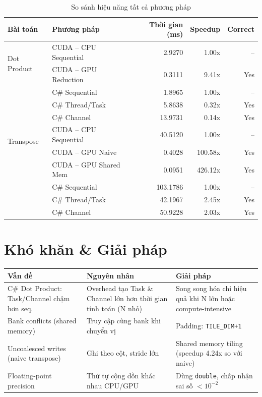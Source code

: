 \documentclass[12pt,a4paper]{article}
\begin{document}
\begin{table}[H]
\centering
\caption{So sánh hiệu năng tất cả phương pháp}
\begin{tabular}{llrrr}
\toprule
\textbf{Bài toán} & \textbf{Phương pháp} & \textbf{Thời gian (ms)} & \textbf{Speedup} & \textbf{Correct} \\
\midrule
\multirow{2}{*}{Dot Product} 
  & CUDA -- CPU Sequential  & 2.9270  & 1.00x & -- \\
  & CUDA -- GPU Reduction   & 0.3111  & 9.41x & Yes \\
  & C\# Sequential          & 1.8965  & 1.00x & -- \\
  & C\# Thread/Task         & 5.8638  & 0.32x & Yes \\
  & C\# Channel             & 13.9731 & 0.14x & Yes \\
\midrule
\multirow{2}{*}{Transpose}
  & CUDA -- CPU Sequential  & 40.5120 & 1.00x & -- \\
  & CUDA -- GPU Naive       & 0.4028  & 100.58x & Yes \\
  & CUDA -- GPU Shared Mem  & 0.0951  & 426.12x & Yes \\
  & C\# Sequential          & 103.1786 & 1.00x & -- \\
  & C\# Thread/Task         & 42.1967  & 2.45x & Yes \\
  & C\# Channel             & 50.9228  & 2.03x & Yes \\
\bottomrule
\end{tabular}
\end{table}

\section{Khó khăn \& Giải pháp}

\begin{table}[H]
\centering
\begin{tabular}{p{3.2cm}p{4cm}p{4.5cm}}
\toprule
\textbf{Vấn đề} & \textbf{Nguyên nhân} & \textbf{Giải pháp} \\
\midrule
C\# Dot Product: Task/Channel chậm hơn seq. & Overhead tạo Task \& Channel lớn hơn thời gian tính toán (N nhỏ) & Song song hóa chỉ hiệu quả khi N lớn hoặc compute-intensive \\
\midrule
Bank conflicts (shared memory) & Truy cập cùng bank khi chuyển vị & Padding: \texttt{TILE\_DIM+1} \\
\midrule
Uncoalesced writes (naive transpose) & Ghi theo cột, stride lớn & Shared memory tiling (speedup 4.24x so với naive) \\
\midrule
Floating-point precision & Thứ tự cộng dồn khác nhau CPU/GPU & Dùng \texttt{double}, chấp nhận sai số $< 10^{-2}$ \\
\bottomrule
\end{tabular}
\end{table}
\end{document}
